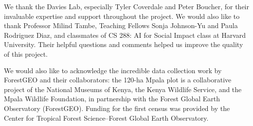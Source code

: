 \documentclass[letterpaper]{article} %
\begin{document}
We thank the Davies Lab, especially Tyler Coverdale and Peter Boucher, for their invaluable expertise and support throughout the project. We would also like to thank Professor Milind Tambe, Teaching Fellows Sonja Johnson-Yu and Paula Rodriguez Diaz, and classmates of CS 288: AI for Social Impact class at Harvard University. Their helpful questions and comments helped us improve the quality of this project.

We would also like to acknowledge the incredible data collection work by ForestGEO and their collaborators: the 120-ha Mpala plot is a collaborative project of the National Museums of Kenya, the Kenya Wildlife Service, and the Mpala Wildlife Foundation, in partnership with the Forest Global Earth Observatory (ForestGEO). Funding for the first census was provided by the Center for Tropical Forest Science--Forest Global Earth Observatory.


\end{document}
